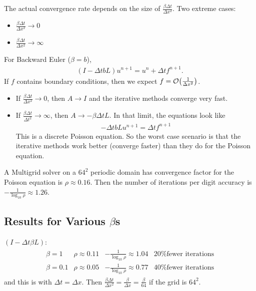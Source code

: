\documentclass{article}
\newcommand{\Dx}{\Delta x}
\newcommand{\Dt}{\Delta t}
\begin{document}
            The actual convergence rate depends on the size of $\frac{\beta\Dt}{\Dx^2}$.  Two extreme cases:
            \begin{itemize}
                \item $\frac{\beta\Dt}{\Dx^2} \rightarrow 0$
                \item $\frac{\beta\Dt}{\Dx^2} \rightarrow \infty$
            \end{itemize}
            For Backward Euler ($\beta = b$),
            \begin{align*}
                (I - \Dt bL)u^{n+1} = u^n + \Dt f^{n+1}.
            \end{align*}
            If $f$ contains boundary conditions, then we expect $f = \order{\frac{1}{\Dx^2}}$.
            \begin{itemize}
                \item If $\frac{\beta\Dt}{\Dx^2} \rightarrow 0$, then $A \rightarrow I$ and the iterative methods converge very fast.
                \item If $\frac{\beta\Dt}{\Dt^2} \rightarrow \infty$, then $A \rightarrow -\beta\Dt L$.  In that limit, the equations look like
                \begin{align*}
                    -\Dt b L u^{n+1} = \Dt f^{n+1}
                \end{align*}
                This is a discrete Poisson equation.  So the worst case scenario is that the iterative methods work better (converge faster) than they do for the Poisson equation.
            \end{itemize}
            A Multigrid solver on a $64^2$ periodic domain has convergence factor for the Poisson equation is $\rho \approx 0.16$.  Then the number of iterations per digit accuracy is $-\frac{1}{\log_{10}\rho} \approx 1.26$.

        \subsection{Results for Various $\beta$s}
            $(I - \Dt\beta L)$:
            \begin{align*}
                \begin{array}{||l|l|l|l||}
                    \beta = 1 & \rho \approx 0.11 & -\frac{1}{\log_{10}\rho} \approx 1.04 & \text{20\% fewer iterations} \\\hline
                    \beta = 0.1 & \rho \approx 0.05 & -\frac{1}{\log_{10}\rho} \approx 0.77 & \text{40\% fewer iterations}
                \end{array}
            \end{align*}
            and this is with $\Dt = \Dx$.  Then $\frac{\beta\Dt}{\Dx^2} = \frac{\beta}{\Dx} = \frac{\beta}{64}$ if the grid is $64^2$.
\end{document}
